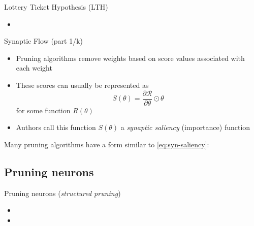 \documentclass[10pt, handout]{beamer}
\begin{document}
\begin{frame}{Lottery Ticket Hypothesis (LTH)}
    \begin{itemize}
        \item 
    \end{itemize}
\end{frame}


\begin{frame}{Synaptic Flow \cite{SynFlow} (part 1/k)}
    \begin{itemize}
        \item\pause Pruning algorithms remove weights based on score values associated with each weight
        \item\pause These scores can usually be represented as
    \begin{equation}\label{eq:syn-saliency}
        S(\theta)=\frac{\partial \mathcal{R}}{\partial \theta} \odot \theta
    \end{equation}
    for some function $R(\theta)$
        \item\pause Authors call this function $S(\theta)$ a \textit{synaptic saliency} (importance) function
    \end{itemize}
\end{frame}


\begin{frame}
\pause Many pruning algorithms have a form similar to \eqref{eq:syn-saliency}:
\end{frame}


\subsection{Pruning neurons}
\begin{frame}{Pruning neurons (\textit{structured pruning})}
    \begin{itemize}
        \item 
        \item 
    \end{itemize}
\end{frame}
\end{document}
